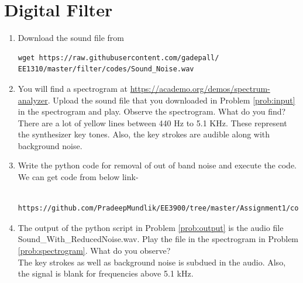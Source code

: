 \documentclass[journal,12pt,twocolumn]{IEEEtran}
\renewcommand\thesection{\arabic{section}}
\begin{document}
\section{Digital Filter}
\begin{enumerate}[label=\thesection.\arabic*
,ref=\thesection.\theenumi]
\item
\label{prob:input}
Download the sound file from  
\begin{lstlisting}
wget https://raw.githubusercontent.com/gadepall/ 
EE1310/master/filter/codes/Sound_Noise.wav
\end{lstlisting}
\item
\label{prob:spectrogram}
You will find a spectrogram at \href{https://academo.org/demos/spectrum-analyzer}{\url{https://academo.org/demos/spectrum-analyzer}}. 
%
Upload the sound file that you downloaded in Problem \ref{prob:input} in the spectrogram  and play.  Observe the spectrogram. What do you find?
\\
%
\solution There are a lot of yellow lines between 440 Hz to 5.1 KHz.  These represent the synthesizer key tones. Also, the key strokes
are audible along with background noise.
\item
\label{prob:output}
Write the python code for removal of out of band noise and execute the code.
\\
\solution
We can get code from below link-
\begin{lstlisting}
     https://github.com/PradeepMundlik/EE3900/tree/master/Assignment1/codes
\end{lstlisting}
% 

%
\item
The output of the python script in Problem \ref{prob:output} is the audio file Sound\_With\_ReducedNoise.wav. Play the file in the spectrogram in Problem \ref{prob:spectrogram}. What do you observe?
\\
\solution The key strokes as well as background noise is subdued in the audio.  Also,  the signal is blank for frequencies above 5.1 kHz.
\end{enumerate}
\end{document}
